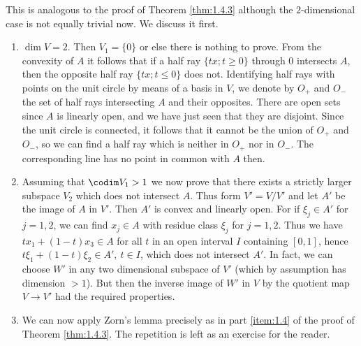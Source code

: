 \begin{prf}
  This is analogous to the proof of Theorem \ref{thm:1.4.3} although
  the $2$-dimensional case is not equally trivial now. We discuss it
  first.
  \begin{enumerate}[label=\alph*),labelindent=\parindent,itemindent=!,leftmargin=0pt]
  \item $\dim V=2$. Then $V_1=\{0\}$ or else there is nothing to
    prove. From the convexity of $A$ it follows that if a half ray
    $\{tx; t\geq0\}$ through $0$ intersects $A$, then the opposite
    half ray $\{tx; t\leq0\}$ does not. Identifying half rays with
    points on the unit circle by means of a basis in $V$, we denote by
    $O_{+}$ and $O_{-}$ the set of half rays intersecting $A$ and
    their opposites. There are open sets since $A$ is linearly open,
    and we have just seen that they are disjoint. Since the unit
    circle is connected, it follows that it cannot be the union of
    $O_{+}$ and $O_{-}$, so we can find a half ray which is neither in
    $O_{+}$ nor in $O_{-}$. The corresponding line has no point in
    common with $A$ then.
  \item Assuming that $\codim V_1>1$ we now prove that there exists a
    strictly larger subspace $V_2$ which does not intersect $A$. Thus
    form $V'=V/V'$ and let $A'$ be the image of $A$ in $V'$. Then $A'$
    is convex and linearly open. For if $\xi_j\in A'$ for $j=1,2$, we
    can find $x_j\in A$ with residue class $\xi_j$ for $j=1,2$. Thus
    we have $tx_1+(1-t)x_3\in A$ for all $t$ in an open interval $I$
    containing $[0,1]$, hence $t\xi_1+(1-t)\xi_2\in A',\ t\in I$,
    which does not intersect $A'$. In fact, we can choose $W'$ in any
    two dimensional subspace of $V'$ (which by assumption has
    dimension $>1$). But then the inverse image of $W'$ in $V$ by the
    quotient map $V\to V'$ had the required properties.
  \item We can now apply Zorn's lemma precisely as in part
    \ref{item:1.4} of the proof of Theorem \ref{thm:1.4.3}. The
    repetition is left as an exercise for the reader.
  \end{enumerate}
\end{prf}

